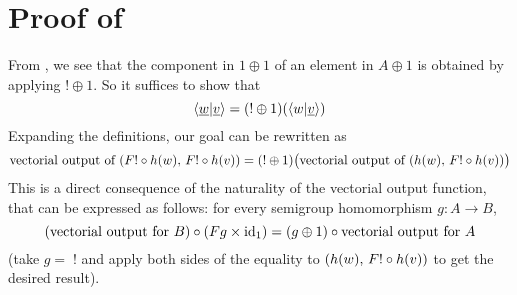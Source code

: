 \section{Proof of }

From , we see that the component in $1 \oplus 1$ of an element in $A \oplus 1$ is obtained by applying $!\oplus1$. So it suffices to show that
\[\langle \underline{w}|\underline{v} \rangle = (!\oplus1)(\langle w|\underline{v} \rangle) \]
Expanding the definitions, our goal can be rewritten as
\[ \text{vectorial output of}\ (\functor! \circ h(w),\, \functor! \circ h(v)) = (!\oplus1)\big(\text{vectorial output of}\ (h(w),\, \functor! \circ h(v))\big) \]
This is a direct consequence of the naturality of the vectorial output function, that can be expressed as follows: for every semigroup homomorphism $g\colon A \to B$,
\[ (\text{vectorial output for $B$}) \circ (\functor g \times \mathrm{id}_1) = (g\oplus1) \circ \text{vectorial output for $A$} \]
(take $g=\;!$ and apply both sides of the equality to $(h(w),\, \functor! \circ h(v))$ to get the desired result).
